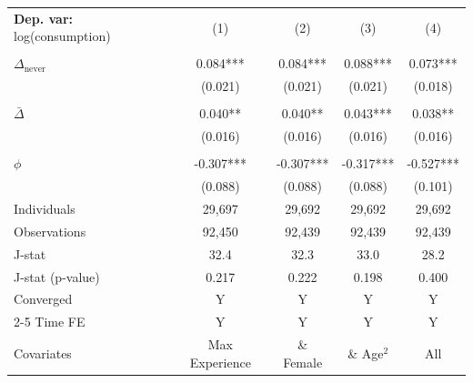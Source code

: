\begin{tabular}{l cccc} \toprule  \textbf{Dep. var:}  log(consumption) 
                    &\multicolumn{1}{c}{(1)}   &\multicolumn{1}{c}{(2)}   &\multicolumn{1}{c}{(3)}   &\multicolumn{1}{c}{(4)}   \\
                    &               &               &               &               \\
\addlinespace
$\Delta_{\text{never}}$&       0.084***&       0.084***&       0.088***&       0.073***\\
                    &     (0.021)   &     (0.021)   &     (0.021)   &     (0.018)   \\
                    &               &               &               &               \\
\addlinespace
$\bar{\Delta}$      &       0.040** &       0.040** &       0.043***&       0.038** \\
                    &     (0.016)   &     (0.016)   &     (0.016)   &     (0.016)   \\
                    &               &               &               &               \\
\addlinespace
$\phi$              &      -0.307***&      -0.307***&      -0.317***&      -0.527***\\
                    &     (0.088)   &     (0.088)   &     (0.088)   &     (0.101)   \\
\addlinespace
Individuals         &      29,697   &      29,692   &      29,692   &      29,692   \\
Observations        &      92,450   &      92,439   &      92,439   &      92,439   \\
J-stat              &        32.4   &        32.3   &        33.0   &        28.2   \\
J-stat (p-value)    &       0.217   &       0.222   &       0.198   &       0.400   \\
Converged           &           Y   &           Y   &           Y   &           Y   \\
\cmidrule{2-5} Time FE & Y & Y & Y & Y \\ Covariates & Max Experience & \& Female & \& Age$^2$ & All \\ \bottomrule \end{tabular}
